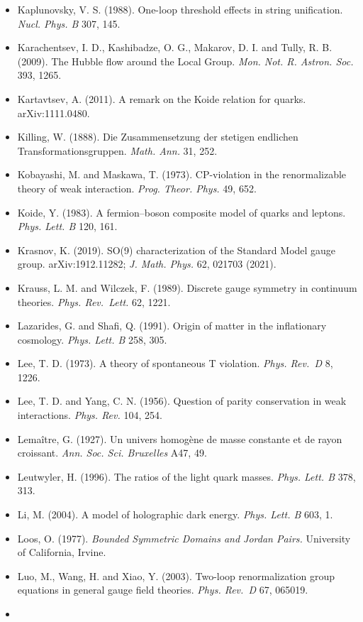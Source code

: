 \documentclass[
  11pt,
]{article}
\begin{document}
\begin{itemize}
\item
  Kaplunovsky, V. S. (1988). One-loop threshold effects in string unification. \emph{Nucl. Phys. B} 307, 145.
\item
  Karachentsev, I. D., Kashibadze, O. G., Makarov, D. I. and Tully, R. B. (2009). The Hubble flow around the Local Group. \emph{Mon. Not. R. Astron. Soc.} 393, 1265.
\item
  Kartavtsev, A. (2011). A remark on the Koide relation for quarks. arXiv:1111.0480.
\item
  Killing, W. (1888). Die Zusammensetzung der stetigen endlichen Transformationsgruppen. \emph{Math. Ann.} 31, 252.
\item
  Kobayashi, M. and Maskawa, T. (1973). CP-violation in the renormalizable theory of weak interaction. \emph{Prog. Theor. Phys.} 49, 652.
\item
  Koide, Y. (1983). A fermion--boson composite model of quarks and leptons. \emph{Phys. Lett. B} 120, 161.
\item
  Krasnov, K. (2019). SO(9) characterization of the Standard Model gauge group. arXiv:1912.11282; \emph{J. Math. Phys.} 62, 021703 (2021).
\item
  Krauss, L. M. and Wilczek, F. (1989). Discrete gauge symmetry in continuum theories. \emph{Phys. Rev.~Lett.} 62, 1221.
\item
  Lazarides, G. and Shafi, Q. (1991). Origin of matter in the inflationary cosmology. \emph{Phys. Lett. B} 258, 305.
\item
  Lee, T. D. (1973). A theory of spontaneous T violation. \emph{Phys. Rev.~D} 8, 1226.
\item
  Lee, T. D. and Yang, C. N. (1956). Question of parity conservation in weak interactions. \emph{Phys. Rev.} 104, 254.
\item
  Lemaître, G. (1927). Un univers homogène de masse constante et de rayon croissant. \emph{Ann. Soc. Sci. Bruxelles} A47, 49.
\item
  Leutwyler, H. (1996). The ratios of the light quark masses. \emph{Phys. Lett. B} 378, 313.
\item
  Li, M. (2004). A model of holographic dark energy. \emph{Phys. Lett. B} 603, 1.
\item
  Loos, O. (1977). \emph{Bounded Symmetric Domains and Jordan Pairs.} University of California, Irvine.
\item
  Luo, M., Wang, H. and Xiao, Y. (2003). Two-loop renormalization group equations in general gauge field theories. \emph{Phys. Rev.~D} 67, 065019.
\item

\end{itemize}
\end{document}
